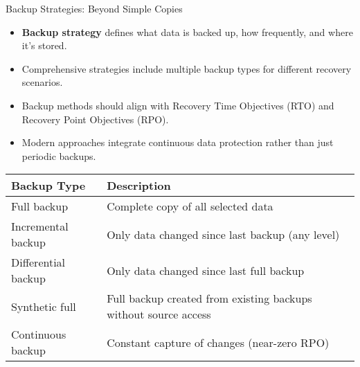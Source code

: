 \documentclass{beamer}
\begin{document}
\begin{frame}{Backup Strategies: Beyond Simple Copies}
    \begin{itemize}
        \item \textbf{Backup strategy} defines what data is backed up, how frequently, and where it's stored.
        \item Comprehensive strategies include multiple backup types for different recovery scenarios.
        \item Backup methods should align with Recovery Time Objectives (RTO) and Recovery Point Objectives (RPO).
        \item Modern approaches integrate continuous data protection rather than just periodic backups.
    \end{itemize}
    
    \begin{table}
        \centering
        \scriptsize
        \begin{tabular}{p{2.5cm}p{7.5cm}}
            \toprule
            \textbf{Backup Type} & \textbf{Description} \\
            \midrule
            Full backup & Complete copy of all selected data \\
            Incremental backup & Only data changed since last backup (any level) \\
            Differential backup & Only data changed since last full backup \\
            Synthetic full & Full backup created from existing backups without source access \\
            Continuous backup & Constant capture of changes (near-zero RPO) \\
            \bottomrule
        \end{tabular}
    \end{table}
\end{frame}
\end{document}
